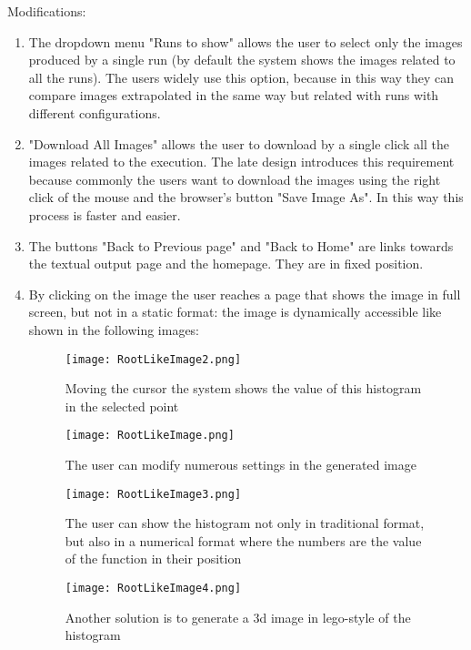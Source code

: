 Modifications:
\begin{enumerate}

\item The dropdown menu "Runs to show" allows the user to select only the images produced by a single run (by default the system shows the images related to all the runs). The users widely use this option, because in this way they can compare images extrapolated in the same way but related with runs with different configurations.

\item "Download All Images" allows the user to download by a single click all the images related to the execution. The late design introduces this requirement because commonly the users want to download the images using the right click of the mouse and the browser's button "Save Image As". In this way this process is faster and easier.

\item The buttons "Back to Previous page" and "Back to Home" are links towards the textual output page and the homepage. They are in fixed position.

\item By clicking on the image the user reaches a page that shows the image in full screen, but not in a static format: the image is dynamically accessible like shown in the following images:

\begin{figure}[H]
\centering
\texttt{[image: RootLikeImage2.png]} 
\caption{Moving the cursor the system shows the value of this histogram in the selected point}
\end{figure}



\begin{figure}[H]
\centering
\texttt{[image: RootLikeImage.png]} 
\caption{The user can modify numerous settings in the generated image}
\end{figure}

\begin{figure}[H]
\centering
\texttt{[image: RootLikeImage3.png]} 
\caption{The user can show the histogram not only in traditional format, but also in a numerical format where the numbers are the value of the function in their position}
\end{figure}

\begin{figure}[H]
\centering
\texttt{[image: RootLikeImage4.png]} 
\caption{Another solution is to generate a 3d image in lego-style of the histogram}
\end{figure}


 
\end{enumerate}


